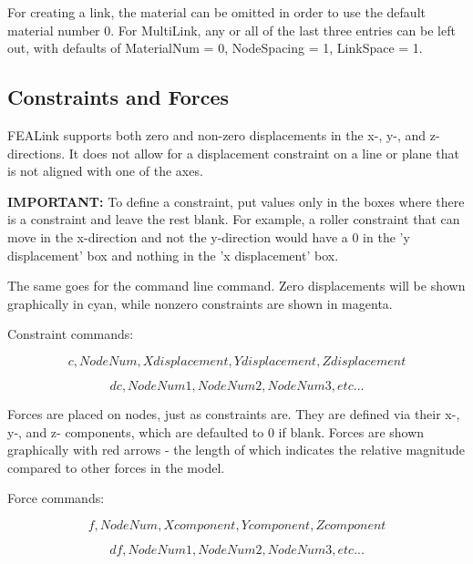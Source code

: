 \documentclass[11pt, oneside]{article}   	%
\begin{document}
For creating a link, the material can be omitted in order to use the default material number 0.  For MultiLink, any or all of the last three entries can be left out, with defaults of MaterialNum = 0, NodeSpacing = 1, LinkSpace = 1.

\subsection{Constraints and Forces}
FEALink supports both zero and non-zero displacements in the x-, y-, and z-directions.  It does not allow for a displacement constraint on a line or plane that is not aligned with one of the axes.  

\textbf{IMPORTANT:} To define a constraint, put values only in the boxes where there is a constraint and leave the rest blank.  For example, a roller constraint that can move in the x-direction and not the y-direction would have a 0 in the 'y displacement' box and nothing in the 'x displacement' box.  

The same goes for the command line command.  Zero displacements will be shown graphically in cyan, while nonzero constraints are shown in magenta.  

Constraint commands:

\begin{equation}
c, NodeNum, Xdisplacement, Ydisplacement, Zdisplacement
\end{equation}

\begin{equation}
dc, NodeNum1, NodeNum2, NodeNum3, etc...
\end{equation}

Forces are placed on nodes, just as constraints are.  They are defined via their x-, y-, and z- components, which are defaulted to 0 if blank.  Forces are shown graphically with red arrows - the length of which indicates the relative magnitude compared to other forces in the model.

Force commands:

\begin{equation}
f, NodeNum, Xcomponent, Ycomponent, Zcomponent
\end{equation}

\begin{equation}
df, NodeNum1, NodeNum2, NodeNum3, etc...
\end{equation}
\end{document}
